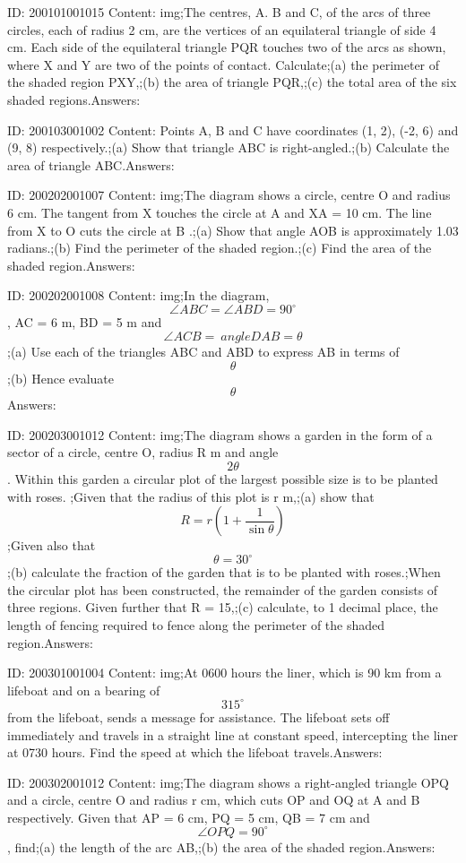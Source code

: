 \documentclass{article}
\begin{document}
ID: 200101001015
Content:
img;The centres, A. B and C, of the arcs of three circles, each of radius 2 cm, are the vertices of an equilateral triangle of side 4 cm. Each side of the equilateral triangle PQR touches two of the arcs as shown, where X and Y are two of the points of contact. Calculate;(a)	the perimeter of the shaded region PXY,;(b)	the area of triangle PQR,;(c)	the total area of the six shaded regions.Answers:

ID: 200103001002
Content:
Points A, B and C have coordinates (1, 2), (-2, 6) and (9, 8) respectively.;(a)	Show that triangle ABC is right-angled.;(b)	Calculate the area of triangle ABC.Answers:

ID: 200202001007
Content:
img;The diagram shows a circle, centre O and radius 6 cm. The tangent from X touches the circle at A and XA = 10 cm. The line from X to O cuts the circle at B .;(a)	Show that angle AOB is approximately 1.03 radians.;(b)	Find the perimeter of the shaded region.;(c)	Find the area of the shaded region.Answers:

ID: 200202001008
Content:
img;In the diagram, $$ \angle ABC =  \angle ABD = 90^{\circ}$$, AC = 6 m, BD = 5 m and $$\angle ACB =\ angle DAB = \theta$$;(a)	Use each of the triangles ABC and ABD to express AB in terms of $$\theta$$;(b)	Hence evaluate $$\theta$$Answers:

ID: 200203001012
Content:
img;The diagram shows a garden in the form of a sector of a circle, centre O, radius R m and angle $$2 \theta$$. Within this garden a circular plot of the largest possible size is to be planted with roses. ;Given that the radius of this plot is r m,;(a)	show that $$R=r(1+ \frac{1}{\sin\theta})$$;Given also that $$\theta = 30^{\circ}$$;(b)	calculate the fraction of the garden that is to be planted with roses.;When the circular plot has been constructed, the remainder of the garden consists of three regions. Given further that R = 15,;(c)	calculate, to 1 decimal place, the length of fencing required to fence along the perimeter of the shaded region.Answers:

ID: 200301001004
Content:
img;At 0600 hours the liner, which is 90 km from a lifeboat and on a bearing of $$315^{\circ}$$ from the lifeboat, sends a message for assistance. The lifeboat sets off immediately and travels in a straight line at constant speed, intercepting the liner at 0730 hours. Find the speed at which the lifeboat travels.Answers:

ID: 200302001012
Content:
img;The diagram shows a right-angled triangle OPQ and a circle, centre O and radius r cm, which cuts OP and OQ at A and B respectively. Given that AP = 6 cm, PQ = 5 cm, QB = 7 cm and $$\angle OPQ=90^{\circ}$$, find;(a)	the length of the arc AB,;(b)	the area of the shaded region.Answers:
\end{document}
